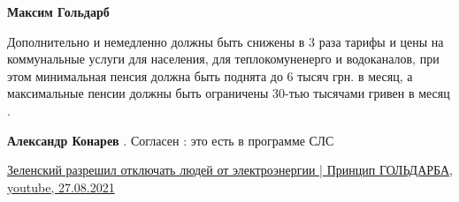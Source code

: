 \begin{itemize}
\textbf{Максим Гольдарб}

Дополнительно и немедленно должны быть снижены в 3 раза тарифы и цены на
коммунальные услуги для населения, для теплокомуненерго и водоканалов, при этом
минимальная пенсия должна быть поднята до 6 тысяч грн. в месяц, а максимальные
пенсии должны быть ограничены 30-тью тысячами гривен в месяц .

 
\textbf{Александр Конарев} . Согласен : это есть в программе СЛС


\href{https://www.youtube.com/watch?v=tbLnY4v-EAo}{%
Зеленский разрешил отключать людей от электроэнергии | Принцип ГОЛЬДАРБА, youtube, 27.08.2021%
}
 

\end{itemize}

